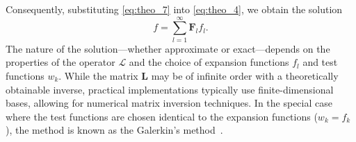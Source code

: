 Consequently, substituting \eqref{eq:theo_7} into \eqref{eq:theo_4}, we obtain the solution
\begin{equation}
    \label{eq:theo_8}
    f = \sum_{l = 1}^{\infty}\mathbf{F}_l f_l.
\end{equation}
The nature of the solution—whether approximate or exact—depends on the properties of the operator $\mathcal{L}$ and the choice of expansion functions $f_l$ and test functions $w_k$. While the matrix $\mathbf{L}$ may be of infinite order with a theoretically obtainable inverse, practical implementations typically use finite-dimensional bases, allowing for numerical matrix inversion techniques. In the special case where the test functions are chosen identical to the expansion functions ($w_k = f_k$), the method is known as the Galerkin's method~\cite{critique}.
